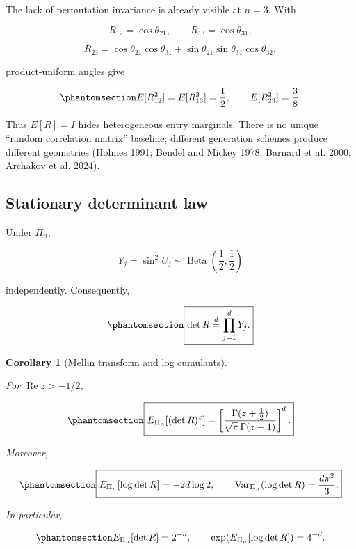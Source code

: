 \documentclass[
  english,
  11pt,
  letterpaper,
  DIV=11,
  numbers=noendperiod]{scrartcl}
\theoremstyle{plain}
\theoremstyle{plain}
\newtheorem{corollary}{Corollary}[section]
\theoremstyle{plain}
\theoremstyle{plain}
\theoremstyle{remark}
\begin{document}
The lack of permutation invariance is already visible at \(n=3\). With

\[
R_{12}=\cos\theta_{21},
\qquad
R_{13}=\cos\theta_{31},
\]

\[
R_{23}
=\cos\theta_{21}\cos\theta_{31}
+\sin\theta_{21}\sin\theta_{31}\cos\theta_{32},
\]

product-uniform angles give

\begin{equation}\protect\phantomsection\label{eq-ordering-moments}{
E[R_{12}^2]=E[R_{13}^2]=\frac12,
\qquad
E[R_{23}^2]=\frac38.
}\end{equation}

Thus \(E[R]=I\) hides heterogeneous entry marginals. There is no unique
``random correlation matrix'' baseline; different generation schemes
produce different geometries (Holmes 1991; Bendel and Mickey 1978;
Barnard et al. 2000; Archakov et al. 2024).

\subsection{Stationary determinant
law}\label{stationary-determinant-law}

Under \(\Pi_n\),

\[
Y_j=\sin^2U_j
\sim\operatorname{Beta}\left(\frac12,\frac12\right)
\]

independently. Consequently,

\begin{equation}\protect\phantomsection\label{eq-product-beta}{
\boxed{
\det R\overset d=\prod_{j=1}^dY_j.
}
}\end{equation}

\begin{corollary}[Mellin transform and log
cumulants]\protect\hypertarget{cor-phasegram-mellin}{}\label{cor-phasegram-mellin}

For \(\operatorname{Re}z>-1/2\),

\begin{equation}\protect\phantomsection\label{eq-det-mellin}{
\boxed{
E_{\Pi_n}[(\det R)^z]
=
\left[
\frac{\Gamma(z+\tfrac12)}
{\sqrt\pi\,\Gamma(z+1)}
\right]^d.
}
}\end{equation}

Moreover,

\begin{equation}\protect\phantomsection\label{eq-logdet-cumulants}{
\boxed{
E_{\Pi_n}[\log\det R]
=-2d\log2,
\qquad
\operatorname{Var}_{\Pi_n}(\log\det R)
=\frac{d\pi^2}{3}.
}
}\end{equation}

In particular,

\begin{equation}\protect\phantomsection\label{eq-det-means}{
E_{\Pi_n}[\det R]=2^{-d},
\qquad
\exp(E_{\Pi_n}[\log\det R])=4^{-d}.
}\end{equation}

\end{corollary}
\end{document}
